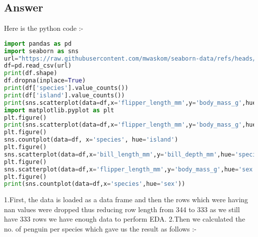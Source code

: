 \documentclass[12pt]{article}
\begin{document}
\subsection*{Answer}
Here is the python code :-
\begin{lstlisting}[language=Python]
import pandas as pd
import seaborn as sns
url="https://raw.githubusercontent.com/mwaskom/seaborn-data/refs/heads/master/penguins.csv"
df=pd.read_csv(url)
print(df.shape)
df.dropna(inplace=True)
print(df['species'].value_counts())
print(df['island'].value_counts())
print(sns.scatterplot(data=df,x='flipper_length_mm',y='body_mass_g',hue='species'))
import matplotlib.pyplot as plt
plt.figure()
print(sns.scatterplot(data=df,x='flipper_length_mm',y='body_mass_g',hue='island'))
plt.figure()
sns.countplot(data=df, x='species', hue='island')
plt.figure()
sns.scatterplot(data=df,x='bill_length_mm',y='bill_depth_mm',hue='species')
plt.figure()
sns.scatterplot(data=df,x='flipper_length_mm',y='body_mass_g',hue='sex')
plt.figure()
print(sns.countplot(data=df,x='species',hue='sex'))


\end{lstlisting}

1.First, the data is loaded as a data frame and then the rows which were having nan values were dropped thus reducing row length from 344 to 333 as we still have 333 rows we have enough data to perform EDA.
2.Then we calculated the no. of penguin per species which gave us the result as follows :-\\
\end{document}
